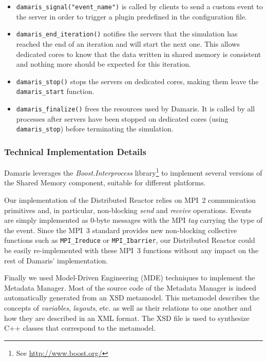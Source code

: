 \begin{itemize}
	\item \texttt{damaris\_signal("event\_name")} is called by clients to send a custom event
	to the server in order to trigger a plugin predefined in the configuration file.
	
	\item \texttt{damaris\_end\_iteration()} notifies the servers that the
	simulation has reached the end of an iteration and will start the next one. This allows
	dedicated cores to know that the data written in shared memory is consistent and nothing
	more should be expected for this iteration.
	
	\item \texttt{damaris\_stop()} stops the servers on dedicated cores, making them leave
	the \texttt{damaris\_start} function.
	
	\item \texttt{damaris\_finalize()} frees the resources used by Damaris. It is called by
	all processes after servers have been stopped on dedicated cores (using \texttt{damaris\_stop})
	before terminating the simulation.
\end{itemize}

\subsubsection{Technical Implementation Details}

Damaris leverages the \textit{Boost.Interprocess} 
library\footnote{See \url{http://www.boost.org/}} to implement several versions of the Shared Memory component,
suitable for different platforms.

Our implementation of the Distributed Reactor relies on MPI~2 communication
primitives and, in particular, non-blocking \emph{send} and \emph{receive} operations. Events are simply
implemented as 0-byte messages with the MPI \emph{tag} carrying the type of the event. Since the MPI~3 standard
provides new non-blocking collective functions such as \texttt{MPI\_Ireduce} or \texttt{MPI\_Ibarrier},
our Distributed Reactor could be easily re-implemented with these MPI~3 functions without any impact on the
rest of Damaris' implementation.

Finally we used Model-Driven Engineering (MDE) techniques to implement the Metadata Manager.
Most of the source code of the Metadata Manager is indeed automatically generated from an XSD metamodel. 
This metamodel describes the concepts of \emph{variables}, \emph{layouts}, etc. 
as well as their relations to one another and how they are described in an XML format.
The XSD file is used to synthesize C++ classes that correspond to the metamodel.

